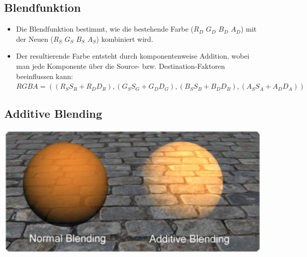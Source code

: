 \documentclass[10pt]{article}
\begin{document}
\subsection{Blendfunktion}
\begin{itemize}
	\item Die Blendfunktion bestimmt, wie die bestehende Farbe ($R_D$ $G_D$ $B_D$ $A_D$) mit der Neuen ($R_S$ $G_S$  $B_S$ $A_S$) kombiniert wird.
	\item Der resultierende Farbe entsteht durch komponentenweise Addition, wobei man jede Komponente über die Source- bzw. Destination-Faktoren beeinflussen kann: \\
	$RGBA = ((R_SS_R + R_DD_R), (G_SS_G + G_DD_G), (B_SS_B + B_DD_B), (A_SS_A + A_DD_A))$
\end{itemize}
\subsection{Additive Blending}
\begin{center}
	\includegraphics[scale=0.2]{additive_blending.png}
\end{center}
\end{document}
